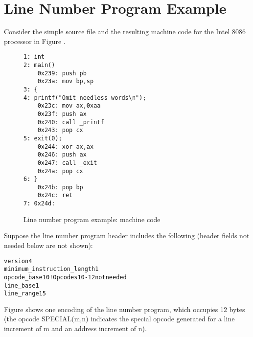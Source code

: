 \section{Line Number Program Example}
\label{app:linenumberprogramexample}

Consider the simple source file and the resulting machine
code for the Intel 8086 processor in 
Figure .

\begin{figure}[here]
\begin{lstlisting}
1: int
2: main()
    0x239: push pb
    0x23a: mov bp,sp
3: {
4: printf("Omit needless words\n");
    0x23c: mov ax,0xaa
    0x23f: push ax
    0x240: call _printf
    0x243: pop cx
5: exit(0);
    0x244: xor ax,ax
    0x246: push ax
    0x247: call _exit
    0x24a: pop cx
6: }
    0x24b: pop bp
    0x24c: ret
7: 0x24d:
\end{lstlisting}
\caption{Line number program example: machine code} \label{fig:linenumberprogramexamplemachinecode}
\end{figure}

Suppose the line number program header includes the following
(header fields not 
needed 
below 
are 
not 
shown):


\begin{alltt}
version                    4
minimum_instruction_length 1
opcode_base               10 ! Opcodes 10-12 not needed
line_base                  1
line_range                15
\end{alltt}


Figure 
shows one encoding of the line number program, which occupies
12 bytes (the opcode SPECIAL(m,n) indicates the special opcode
generated for a line increment of m and an address increment
of n).


